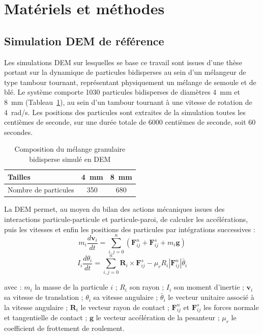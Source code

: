 \documentclass{MemoireMaster}
\begin{document}
\section{Matériels et méthodes}

\subsection{Simulation DEM de référence}
Les simulations DEM sur lesquelles se base ce travail sont issues d'une thèse portant sur la dynamique de particules bidisperses au sein d'un mélangeur de type tambour tournant, représentant physiquement un mélange de semoule et de blé. Le système comporte 1030 particules bidisperses de diamètres 4~mm et 8~mm (Tableau~\ref{tab:particules}), au sein d'un tambour tournant à une vitesse de rotation de 4~rad/s. Les positions des particules sont extraites de la simulation toutes les centièmes de seconde, sur une durée totale de 6000 centièmes de seconde, soit 60 secondes.

\begin{table}[ht]
\centering
\caption{Composition du mélange granulaire bidisperse simulé en DEM}
\label{tab:particules}
\begin{tabular}{|l|c|c|}
\hline
Tailles & 4~mm & 8~mm \\
\hline
Nombre de particules & 350 & 680 \\
\hline
\end{tabular}
\end{table}

La DEM permet, au moyen du bilan des actions mécaniques issues des interactions particule-particule et particule-paroi, de calculer les accélérations, puis les vitesses et enfin les positions des particules par intégrations successives \cite{tjakra2013} :
\begin{equation}
m_i \frac{d\mathbf{v}_i}{dt} = \sum_{i,j=0}^{n} \left( \mathbf{F}_{ij}^n + \mathbf{F}_{ij}^s + m_i \mathbf{g} \right)
\end{equation}
\begin{equation}
I_i \frac{d\theta_i}{dt} = \sum_{i,j=0}^{n} \mathbf{R}_i \times \mathbf{F}_{ij}^s - \mu_r R_i \left| \mathbf{F}_{ij}^n \right| \bar{\theta}_i
\end{equation}

avec : $m_i$ la masse de la particule $i$ ; $R_i$ son rayon ; $I_i$ son moment d'inertie ; $\mathbf{v}_i$ sa vitesse de translation ; $\theta_i$ sa vitesse angulaire ; $\bar{\theta}_i$ le vecteur unitaire associé à la vitesse angulaire ; $\mathbf{R}_i$ le vecteur rayon de contact ; $\mathbf{F}_{ij}^n$ et $\mathbf{F}_{ij}^s$ les forces normale et tangentielle de contact ; $\mathbf{g}$ le vecteur accélération de la pesanteur ; $\mu_r$ le coefficient de frottement de roulement.
\end{document}
